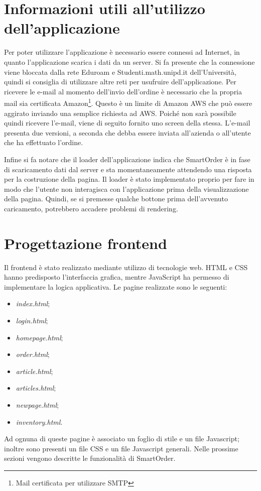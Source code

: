 \documentclass[12pt, a4paper, titlepage]{report}
\begin{document}
	\section{Informazioni utili all'utilizzo dell'applicazione}
	
	Per poter utilizzare l'applicazione è necessario essere connessi ad Internet, in quanto l'applicazione scarica i dati da un server. Si fa presente che la connessione viene bloccata dalla rete Eduroam e Studenti.math.unipd.it dell'Università, quindi si consiglia di utilizzare altre reti per usufruire dell'applicazione. Per ricevere le e-mail al momento dell'invio dell'ordine è necessario che la propria mail sia certificata Amazon\footnote{Mail certificata per utilizzare SMTP}. Questo è un limite di Amazon AWS che può essere aggirato inviando una semplice richiesta ad AWS. Poiché non sarà possibile quindi ricevere l'e-mail, viene di seguito fornito uno screen della stessa. L'e-mail presenta due versioni, a seconda che debba essere inviata all'azienda o all'utente che ha effettuato l'ordine.
	\medskip
	
	
	\noindent Infine si fa notare che il loader dell'applicazione indica che SmartOrder è in fase di scaricamento dati dal server e sta momentaneamente attendendo una risposta per la costruzione della pagina. Il loader è stato implementato proprio per fare in modo che l'utente non interagisca con l'applicazione prima della visualizzazione della pagina. Quindi, se si premesse qualche bottone prima dell'avvenuto caricamento, potrebbero accadere problemi di rendering.
	
	\section{Progettazione frontend}
	
	Il frontend è stato realizzato mediante utilizzo di tecnologie web. HTML e CSS hanno predisposto l'interfaccia grafica, mentre JavaScript ha permesso di implementare la logica applicativa.
	Le pagine realizzate sono le seguenti:
	\begin{itemize}
		\item \textit{index.html};
		\item \textit{login.html};
		\item \textit{homepage.html};
		\item \textit{order.html};
		\item \textit{article.html};
		\item \textit{articles.html};
		\item \textit{newpage.html};
		\item \textit{inventory.html}.
	\end{itemize}
	Ad ognuna di queste pagine è associato un foglio di stile e un file Javascript; inoltre sono presenti un file CSS e un file Javascript generali. Nelle prossime sezioni vengono descritte le funzionalità di SmartOrder.
	
\end{document}
